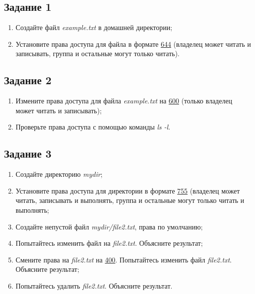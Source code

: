 \documentclass[12pt, a4paper]{report}
\begin{document}
		\subsection*{Задание 1}
		\begin{enumerate}
			\item Создайте файл \textit{example.txt} в домашней директории;
			\item Установите права доступа для файла в формате \underline{644} (владелец может читать и записывать, группа и остальные могут только читать).
		\end{enumerate}
		\lstset{style=mystyle}
		

		\subsection*{Задание 2}
		\begin{enumerate}
			\item Измените права доступа для файла \textit{example.txt} на \underline{600} (только владелец может читать и записывать);
			\item Проверьте права доступа с помощью команды \textit{ls -l}.
		\end{enumerate}
		\lstset{style=mystyle}
		

		\subsection*{Задание 3}
		\begin{enumerate}
			\item Создайте директорию \textit{mydir};
			\item Установите права доступа для директории в формате \underline{755} (владелец может читать, записывать и выполнять, группа и остальные могут только читать и выполнять;
			\item Создайте непустой файл \textit{mydir/file2.txt}, права по умолчанию;
			\item Попытайтесь изменить файл на \textit{file2.txt}. Объясните результат;
			\item Смените права на \textit{file2.txt} на \underline{400}. Попытайтесь изменить файл \textit{file2.txt}. Объясните результат;
			\item Попытайтесь удалить \textit{file2.txt}. Объясните результат.
		\end{enumerate}
		\lstset{style=mystyle}
		
\end{document}
